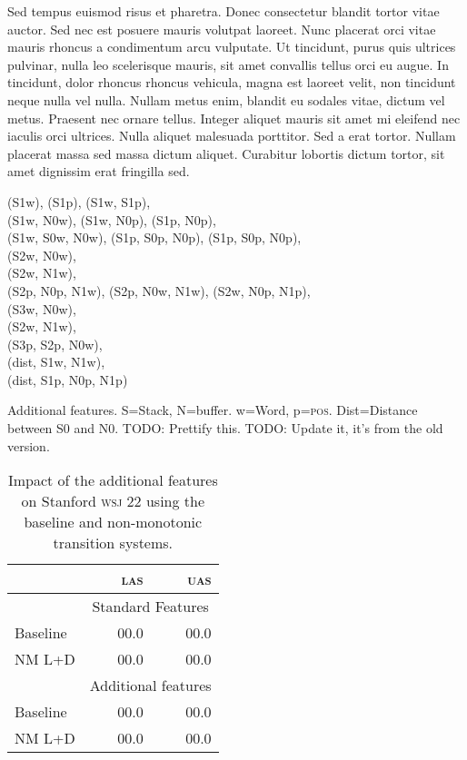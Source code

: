 \documentclass[11pt,letterpaper]{article}
\newcommand{\las}{\textsc{las}\xspace}
\newcommand{\uas}{\textsc{uas}\xspace}
\newcommand{\pos}{\textsc{pos}\xspace}
\newcommand{\wsj}{\textsc{wsj}\xspace}
\begin{document}
Sed tempus euismod risus et pharetra. Donec consectetur blandit tortor vitae auctor. Sed nec est posuere mauris volutpat laoreet. Nunc placerat orci vitae mauris rhoncus a condimentum arcu vulputate. Ut tincidunt, purus quis ultrices pulvinar, nulla leo scelerisque mauris, sit amet convallis tellus orci eu augue. In tincidunt, dolor rhoncus rhoncus vehicula, magna est laoreet velit, non tincidunt neque nulla vel nulla. Nullam metus enim, blandit eu sodales vitae, dictum vel metus. Praesent nec ornare tellus. Integer aliquet mauris sit amet mi eleifend nec iaculis orci ultrices. Nulla aliquet malesuada porttitor. Sed a erat tortor. Nullam placerat massa sed massa dictum aliquet. Curabitur lobortis dictum tortor, sit amet dignissim erat fringilla sed.
\begin{table}
\small

\centering
(S1w), (S1p), (S1w, S1p),\\
(S1w, N0w), (S1w, N0p), (S1p, N0p),\\
(S1w, S0w, N0w), (S1p, S0p, N0p), (S1p, S0p, N0p),\\
(S2w, N0w),\\
(S2w, N1w),\\
(S2p, N0p, N1w), (S2p, N0w, N1w), (S2w, N0p, N1p), \\
(S3w, N0w), \\
(S2w, N1w),\\ 
(S3p, S2p, N0w),\\
(dist, S1w, N1w),\\
(dist, S1p, N0p, N1p)
\caption{Additional features. S=Stack, N=buffer. w=Word, p=\pos. Dist=Distance
     between S0 and N0. TODO: Prettify this. TODO: Update it, it's from the old version.}
\end{table}

\begin{table}
\centering
\begin{tabular}{lrr}
    \hline 
            & \las  & \uas  \\
    \hline \hline 
                & \multicolumn{2}{c}{Standard Features} \\
                \hline
    Baseline    & 00.0 & 00.0 \\
    NM L+D      & 00.0 & 00.0 \\
\hline
                & \multicolumn{2}{c}{Additional features} \\
                \hline
    Baseline    & 00.0 & 00.0 \\
    NM L+D      & 00.0 & 00.0 \\
\end{tabular}
\caption{
    \small
    Impact of the additional features on Stanford \wsj22 using the baseline and
    non-monotonic transition systems.
\label{tab:feats}}
\end{table}
\end{document}
